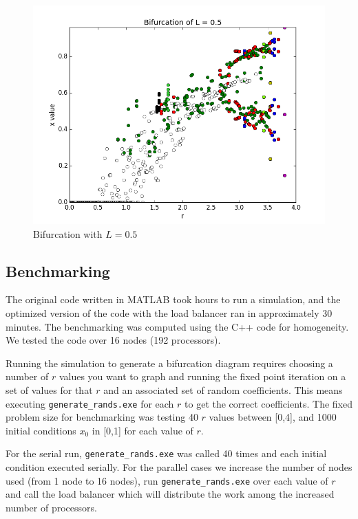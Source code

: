 \documentclass[12pt]{article}
\begin{document}
 \begin{figure}[H]
	\begin{center}
		\includegraphics[scale=0.5]{Bifurcation_L5}
\caption{Bifurcation with $L=0.5$}\label{lb_bif_5}
	\end{center}
\end{figure}

\subsection{Benchmarking}
\hspace{5mm} The original code written in MATLAB took hours to run a
simulation, and the optimized version of the code with the load
balancer ran in approximately 30 minutes. The benchmarking was
computed using the C++ code for homogeneity. We tested the code over
16 nodes (192 processors). 

Running the simulation to generate a bifurcation diagram requires choosing a number of $r$ values you want to graph and running the fixed point
  iteration on a set of values for that $r$ and an associated set of
  random coefficients. This means executing
  \texttt{generate\_rands.exe} for each $r$ to get the correct
  coefficients. The fixed problem size for benchmarking was testing 40
  $r$ values between [0,4], and 1000 initial conditions $x_0$ in [0,1]
  for each value of $r$.

For the serial run,
  \texttt{generate\_rands.exe} was called 40 times and each initial
  condition executed serially. For the parallel cases we increase the number of nodes used (from 1 node to 16 nodes), run
\texttt{generate\_rands.exe} over each value of $r$ and call the load
balancer which will distribute the work among the increased number of
processors.
\end{document}
